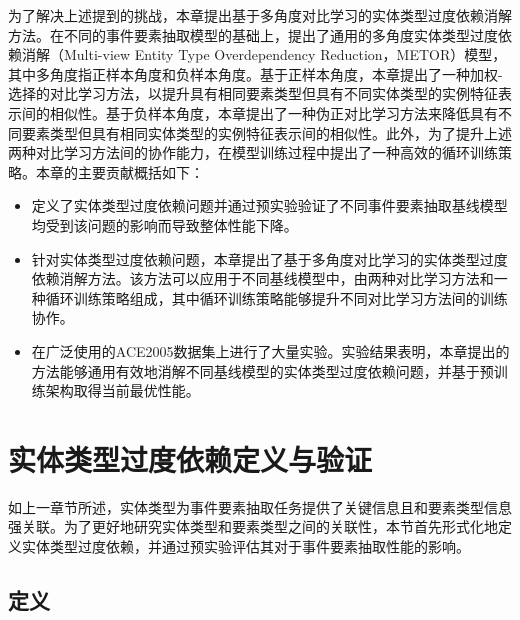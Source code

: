 为了解决上述提到的挑战，本章提出基于多角度对比学习的实体类型过度依赖消解方法。在不同的事件要素抽取模型的基础上，提出了通用的多角度实体类型过度依赖消解（Multi-view Entity Type Overdependency Reduction，METOR）模型，其中多角度指正样本角度和负样本角度。基于正样本角度，本章提出了一种加权-选择的对比学习方法，以提升具有相同要素类型但具有不同实体类型的实例特征表示间的相似性。基于负样本角度，本章提出了一种伪正对比学习方法来降低具有不同要素类型但具有相同实体类型的实例特征表示间的相似性。此外，为了提升上述两种对比学习方法间的协作能力，在模型训练过程中提出了一种高效的循环训练策略。本章的主要贡献概括如下：

\begin{itemize}
\item 定义了实体类型过度依赖问题并通过预实验验证了不同事件要素抽取基线模型均受到该问题的影响而导致整体性能下降。
\item 针对实体类型过度依赖问题，本章提出了基于多角度对比学习的实体类型过度依赖消解方法。该方法可以应用于不同基线模型中，由两种对比学习方法和一种循环训练策略组成，其中循环训练策略能够提升不同对比学习方法间的训练协作。
\item 在广泛使用的ACE2005数据集上进行了大量实验。实验结果表明，本章提出的方法能够通用有效地消解不同基线模型的实体类型过度依赖问题，并基于预训练架构取得当前最优性能。
\end{itemize}

\section{实体类型过度依赖定义与验证}
\label{two}
如上一章节所述，实体类型为事件要素抽取任务提供了关键信息且和要素类型信息强关联。为了更好地研究实体类型和要素类型之间的关联性，本节首先形式化地定义实体类型过度依赖，并通过预实验评估其对于事件要素抽取性能的影响。

\subsection{定义}

